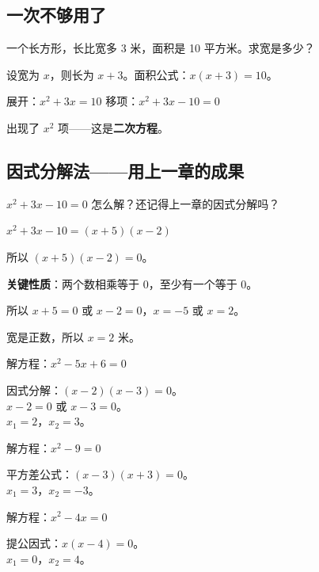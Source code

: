 

\subsection*{一次不够用了}

一个长方形，长比宽多 3 米，面积是 10 平方米。求宽是多少？

设宽为 $x$，则长为 $x+3$。面积公式：$x(x+3)=10$。

展开：$x^2 + 3x = 10$
移项：$x^2 + 3x - 10 = 0$

出现了 $x^2$ 项——这是\textbf{二次方程}。

\subsection*{因式分解法——用上一章的成果}

$x^2 + 3x - 10 = 0$ 怎么解？还记得上一章的因式分解吗？

$x^2 + 3x - 10 = (x+5)(x-2)$

所以 $(x+5)(x-2) = 0$。

\textbf{关键性质}：两个数相乘等于 0，至少有一个等于 0。

所以 $x+5=0$ 或 $x-2=0$，$x=-5$ 或 $x=2$。

宽是正数，所以 $x=2$ 米。

\begin{example}
解方程：$x^2 - 5x + 6 = 0$
\end{example}
\begin{solution}
因式分解：$(x-2)(x-3)=0$。\\
$x-2=0$ 或 $x-3=0$。\\
$x_1 = 2$，$x_2 = 3$。
\end{solution}

\begin{example}
解方程：$x^2 - 9 = 0$
\end{example}
\begin{solution}
平方差公式：$(x-3)(x+3)=0$。\\
$x_1 = 3$，$x_2 = -3$。
\end{solution}

\begin{example}
解方程：$x^2 - 4x = 0$
\end{example}
\begin{solution}
提公因式：$x(x-4)=0$。\\
$x_1 = 0$，$x_2 = 4$。
\end{solution}

